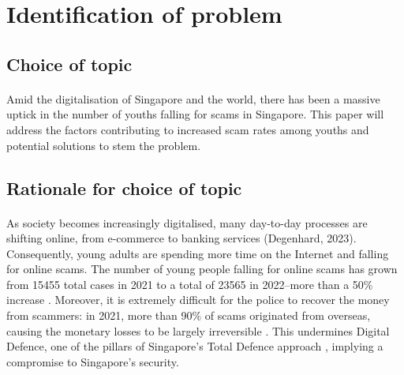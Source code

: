 \documentclass[a4paper]{article}
\begin{document}

\begin{abstract}
  \noindent
  \ldots?
\end{abstract}

\newpage


\tableofcontents

\newpage


\section{Identification of problem}
\subsection{Choice of topic}
\paragraph{} Amid the digitalisation of Singapore and the world, there has been
a massive uptick in the number of youths falling for scams in Singapore. This
paper will address the factors contributing to increased scam rates among youths
and potential solutions to stem the problem.

\subsection{Rationale for choice of topic}
\paragraph{} As society becomes increasingly digitalised, many day-to-day
processes are shifting online, from e-commerce \parencite{ITA.2022} to banking
services (Degenhard, 2023). Consequently, young adults are spending more time on
the Internet and falling for online scams. The number of young people falling
for online scams has grown from 15455 total cases in 2021 to a total of 23565 in
2022–more than a 50\% increase \parencite{Tham.2023}. Moreover, it is extremely
difficult for the police to recover the money from scammers: in 2021, more than
90\% of scams originated from overseas, causing the monetary losses to be
largely irreversible \parencite{Begum.2022}. This undermines Digital Defence,
one of the pillars of Singapore’s Total Defence approach \parencite{SCDF.2023},
implying a compromise to Singapore’s security.
\end{document}
